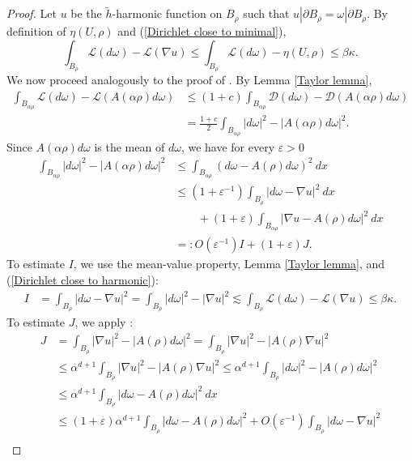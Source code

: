 \documentclass[reqno,12pt,letterpaper]{amsart}
\newcommand{\Lagrange}{\mathscr L}
\newcommand{\DirL}{\mathscr D}
\theoremstyle{definition}
\numberwithin{equation}{section}
\begin{document}
\begin{proof}
Let $u$ be the $\tilde h$-harmonic function on $B_\rho$ such that $u|\partial B_\rho = \omega|\partial B_\rho$.
By definition of $\eta(U, \rho)$ and (\ref{Dirichlet close to minimal}),
\begin{equation}\label{Dirichlet close to harmonic}
\int_{B_\rho} \Lagrange(d\omega) - \Lagrange(\nabla u) \leq \int_{B_\rho} \Lagrange(d\omega) - \eta(U, \rho) \leq \beta\kappa.
\end{equation}
We now proceed analogously to the proof of \cite[Lemma 4.2]{Miranda66}. By Lemma \ref{Taylor lemma},
\begin{align*}
\int_{B_{\alpha\rho}} \Lagrange(d\omega) - \Lagrange(A(\alpha\rho)d\omega) &\leq (1 + c)\int_{B_{\alpha\rho}} \DirL(d\omega) - \DirL(A(\alpha\rho)d\omega) \\
&= \frac{1 + c}{2} \int_{B_{\alpha\rho}} |d\omega|^2 - |A(\alpha\rho)d\omega|^2.
\end{align*}
Since $A(\alpha\rho)d\omega$ is the mean of $d\omega$, we have for every $\varepsilon > 0$
\begin{align*}
\int_{B_{\alpha\rho}} |d\omega|^2 - |A(\alpha\rho)d\omega|^2 &\leq \int_{B_{\alpha\rho}} (d\omega - A(\rho)d\omega)^2 ~dx \\
&\leq (1 + \varepsilon^{-1})\int_{B_\rho} |d\omega - \nabla u|^2 ~dx\\
&\qquad + (1 + \varepsilon) \int_{B_{\alpha\rho}} |\nabla u - A(\rho)d\omega|^2 ~dx\\
&=: O(\varepsilon^{-1})I + (1 + \varepsilon)J.
\end{align*}
To estimate $I$, we use the mean-value property, Lemma \ref{Taylor lemma}, and (\ref{Dirichlet close to harmonic}):
\begin{align*}
I &= \int_{B_\rho} |d\omega - \nabla u|^2 = \int_{B_\rho} |d\omega|^2 - |\nabla u|^2 \lesssim \int_{B_\rho} \Lagrange(d\omega) - \Lagrange(\nabla u) \leq \beta \kappa.
\end{align*}
To estimate $J$, we apply \cite[Lemma 4.1]{Miranda66}:
\begin{align*}
J &= \int_{B_\rho} |\nabla u|^2 - |A(\rho)d\omega|^2 = \int_{B_\rho} |\nabla u|^2 - |A(\rho)\nabla u|^2 \\
&\leq \alpha^{d + 1} \int_{B_\rho} |\nabla u|^2 - |A(\rho)\nabla u|^2 \leq \alpha^{d + 1} \int_{B_\rho} |d\omega|^2 - |A(\rho)d\omega|^2 \\
&\leq \alpha^{d + 1} \int_{B_\rho} |d\omega - A(\rho)d\omega|^2 ~dx \\
&\leq (1 + \varepsilon)\alpha^{d + 1} \int_{B_\rho} |d\omega - A(\rho)d\omega|^2  + O(\varepsilon^{-1})\int_{B_\rho} |d\omega - \nabla u|^2\\

\end{align*}
\end{proof}
\end{document}
